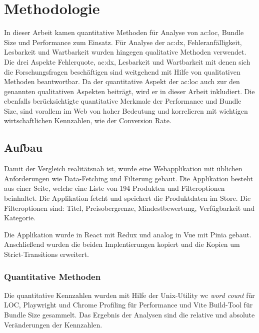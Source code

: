\chapter{Methodologie}


In dieser Arbeit kamen quantitative Methoden für Analyse von \acrshort{ac:loc}, Bundle Size und Performance zum Einsatz. Für Analyse der \acrlong{ac:dx}, Fehleranfälligkeit, Lesbarkeit und Wartbarkeit wurden hingegen qualitative Methoden verwendet. Die drei Aspekte Fehlerquote, \acrshort{ac:dx}, Lesbarkeit und Wartbarkeit mit denen sich die Forschungsfragen beschäftigen sind weitgehend mit Hilfe von qualitativen Methoden beantwortbar. Da der quantitative Aspekt der \acrshort{ac:loc} auch zur den genannten qualitativen Aspekten beiträgt, wird er in dieser Arbeit inkludiert. Die ebenfalls berücksichtigte quantitative Merkmale der Performance und Bundle Size, sind vorallem im Web von hoher Bedeutung und korrelieren mit wichtigen wirtschaftlichen Kennzahlen, wie der Conversion Rate.\cite{googleConversionRateSpeed}

\section {Aufbau}

Damit der Vergleich realitätsnah ist, wurde eine Webapplikation mit üblichen Anforderungen wie Data-Fetching und Filterung gebaut. Die Applikation besteht aus einer Seite, welche eine Liste von 194 Produkten und Filteroptionen beinhaltet. Die Applikation fetcht und speichert die Produktdaten im Store. Die Filteroptionen sind: Titel, Preisobergrenze, Mindestbewertung, Verfügbarkeit und Kategorie.

Die Applikation wurde in React mit Redux und analog in Vue mit Pinia gebaut. Anschließend wurden die beiden Implentierungen kopiert und die Kopien um Strict-Transitions erweitert. 

\subsection{Quantitative Methoden}
Die quantitative Kennzahlen wurden mit Hilfe der Unix-Utility wc \textit{word count} für LOC, Playwright und Chrome Profiling für Performance und Vite Build-Tool für Bundle Size gesammelt. Das Ergebnis der Analysen sind die relative und absolute Veränderungen der Kennzahlen.

